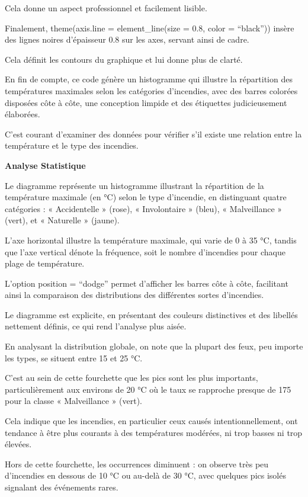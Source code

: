 \documentclass[
]{article}
\begin{document}
Cela donne un aspect professionnel et facilement lisible.

Finalement, theme(axis.line = element\_line(size = 0.8, color =
``black'')) insère des lignes noires d'épaisseur 0.8 sur les axes,
servant ainsi de cadre.

Cela définit les contours du graphique et lui donne plus de clarté.

En fin de compte, ce code génère un histogramme qui illustre la
répartition des températures maximales selon les catégories d'incendies,
avec des barres colorées disposées côte à côte, une conception limpide
et des étiquettes judicieusement élaborées.

C'est courant d'examiner des données pour vérifier s'il existe une
relation entre la température et le type des incendies.

\textbf{Analyse Statistique}

Le diagramme représente un histogramme illustrant la répartition de la
température maximale (en °C) selon le type d'incendie, en distinguant
quatre catégories : « Accidentelle » (rose), « Involontaire » (bleu), «
Malveillance » (vert), et « Naturelle » (jaune).

L'axe horizontal illustre la température maximale, qui varie de 0 à 35
°C, tandis que l'axe vertical dénote la fréquence, soit le nombre
d'incendies pour chaque plage de température.

L'option position = ``dodge'' permet d'afficher les barres côte à côte,
facilitant ainsi la comparaison des distributions des différentes sortes
d'incendies.

Le diagramme est explicite, en présentant des couleurs distinctives et
des libellés nettement définis, ce qui rend l'analyse plus aisée.

En analysant la distribution globale, on note que la plupart des feux,
peu importe les types, se situent entre 15 et 25 °C.

C'est au sein de cette fourchette que les pics sont les plus importants,
particulièrement aux environs de 20 °C où le taux se rapproche presque
de 175 pour la classe « Malveillance » (vert).

Cela indique que les incendies, en particulier ceux causés
intentionnellement, ont tendance à être plus courants à des températures
modérées, ni trop basses ni trop élevées.

Hors de cette fourchette, les occurrences diminuent : on observe très
peu d'incendies en dessous de 10 °C ou au-delà de 30 °C, avec quelques
pics isolés signalant des événements rares.
\end{document}
